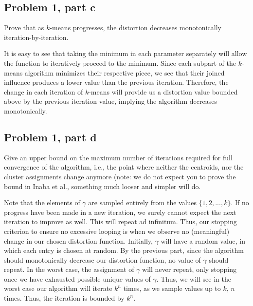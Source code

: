 \newpage
\subsection{Problem 1, part c}
Prove that as $k$-means progresses, the distortion decreases monotonically iteration-by-iteration. 
\partbreak
\begin{solution}

    It is easy to see that taking the minimum in each parameter separately will allow the function to iteratively proceed to the minimum. Since each subpart of the $k$-means algorithm minimizes their respective piece, we see that their joined influence produces a lower value than the previous iteration. Therefore, the change in each iteration of $k$-means will provide us a distortion value bounded above by the previous iteration value, implying the algorithm decreases monotonically. 
\end{solution}

\newpage
\subsection{Problem 1, part d}
Give an upper bound on the maximum number of iterations required for full convergence of the algorithm, i.e., the point where neither the centroids, nor the cluster assignments change anymore (note: we do not expect you to prove the bound in Inaba et al., something much looser and simpler will do. 
\partbreak
\begin{solution}

    Note that the elements of $\gamma$ are sampled entirely from the values $\{1, 2, ..., k\}$. If no progress have been made in a new iteration, we surely cannot expect the next iteration to improve as well. This will repeat ad infinitum. Thus, our stopping criterion to ensure no excessive looping is when we observe no (meaningful) change in our chosen distortion function. Initially, $\gamma$ will have a random value, in which each entry is chosen at random. By the previous part, since the algorithm should monotonically decrease our distortion function, no value of $\gamma$ should repeat. In the worst case, the assignment of $\gamma$ will never repeat, only stopping once we have exhausted possible unique values of $\gamma$. Thus, we will see in the worst case our algorithm will iterate $k^n$ times, as we sample values up to $k$, $n$ times. Thus, the iteration is bounded by $k^n$. 
\end{solution}

\newpage
